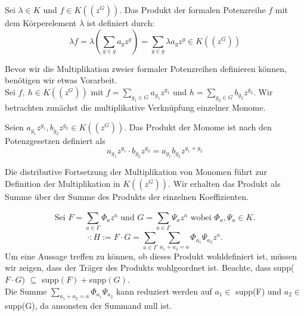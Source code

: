 %
%
%
\begin{defn}\label{MultiplikationMitKörperelement}
Sei $\lambda \in K$ und $f \in K\left(\left(z^{G}\right)\right)$. Das Produkt der formalen Potenzreihe $f$ mit dem Körperelement $\lambda$ ist definiert durch: \[\lambda f = \lambda \left(\sum_{g \in g}^{} a_g z^g\right) = \sum_{g \in g}^{} \lambda a_g z^g \in K\left(\left(z^{G}\right)\right)\]
\end{defn}
  
Bevor wir die Multiplikation zweier formaler Potenzreihen definieren können, benötigen wir etwas Vorarbeit.\\
Sei $f,~ h \in K\left(\left(z^{G}\right)\right)$ mit $ f = \sum_{g_1 \in G}^{} a_{g_1} z^{g_1} \text{ und } h = \sum_{g_2 \in G}^{} b_{g_2} z^{g_2} $. 
%
%
%
%
%
%
Wir betrachten zunächst die multiplikative Verknüpfung einzelner Monome. 
\begin{defn}
Seien $a_{g_1} z^{g_1}, b_{g_2} z^{g_2} \in K\left(\left(z^G\right)\right)$. Das Produkt der Monome ist nach den Potenzgesetzen definiert als 
\[a_{g_1} z^{g_1} \cdot b_{g_2}z^{g_2} = a_{g_1} b_{g_2} z^{g_1 + g_2}\]
\end{defn}
%
%
%
%
%
%
%
%
%
Die distributive Fortsetzung der Multiplikation von Monomen führt zur Definition der Multiplikation in $K\left(\left(z^{G}\right)\right)$. Wir erhalten das Produkt als Summe über der Summe des Produkts der einzelnen Koeffizienten.
%
%
%
\begin{defn}\label{MultiplikationformalePotenzreihen}


\end{defn}
\[ \text{Sei } F = \sum_{a \in \Gamma}^{} \Phi_a z^a \text{ und } G = \sum_{a \in \Gamma}^{} \Psi_a z^a \text{ wobei } \Phi_a, \Psi_a \in K. \]
\begin{equation}\label{eq: multPotenzreihenkoerper}  
\cdot: H:= F \cdot G = \sum_{a \in \Gamma}^{}\sum_{a_1 + a_2 = a}^{}\Phi_{a_1} \Psi_{a_2}z^a.  
\end{equation}                         
Um eine Aussage treffen zu können, ob dieses Produkt wohldefiniert ist, müssen wir zeigen, dass der Träger des Produkts wohlgeordnet ist. Beachte, dass supp($F\cdot G$) $\subseteq$ supp$(F)+ $supp$(G)$. \\ 
Die Summe $\sum_{a_1 + a_2 = a}^{}\Phi_{a_1} \Psi_{a_2}$ kann reduziert werden auf $a_1\in$ supp(F) und $a_2\in$ supp(G), da ansonsten der Summand null ist. \\
